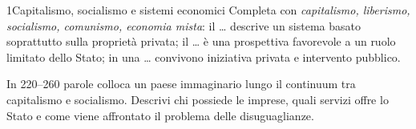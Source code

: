 \begin{lettura}{1}{Capitalismo, socialismo e sistemi economici}
\lingua
Completa con \emph{capitalismo, liberismo, socialismo, comunismo, economia mista}: il \ldots{} descrive un sistema basato soprattutto sulla proprietà privata; il \ldots{} è una prospettiva favorevole a un ruolo limitato dello Stato; in una \ldots{} convivono iniziativa privata e intervento pubblico.

\scrittura
In 220--260 parole colloca un paese immaginario lungo il continuum tra capitalismo e socialismo. Descrivi chi possiede le imprese, quali servizi offre lo Stato e come viene affrontato il problema delle disuguaglianze.

\end{lettura}



\clearpage{}




